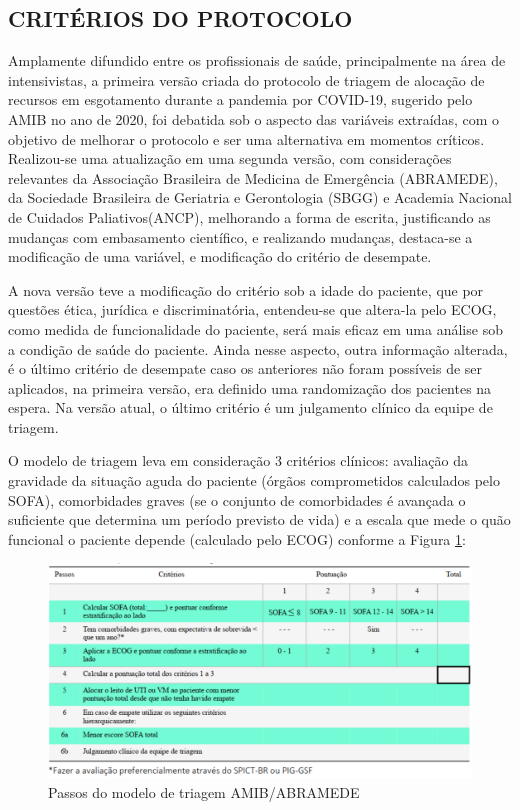 \documentclass[12pt]{article}
\begin{document}
\subsection{CRITÉRIOS DO PROTOCOLO}

Amplamente difundido entre os profissionais de saúde, principalmente na área de intensivistas, a primeira versão criada do protocolo de triagem de alocação de recursos em esgotamento durante a pandemia por COVID-19, sugerido pelo AMIB no ano de 2020, foi debatida sob o aspecto das variáveis extraídas, com o objetivo de melhorar o protocolo e ser uma alternativa em momentos críticos. Realizou-se uma atualização em uma segunda versão, com considerações relevantes da Associação Brasileira de Medicina de Emergência (ABRAMEDE), da Sociedade Brasileira de Geriatria e Gerontologia (SBGG) e Academia Nacional de Cuidados Paliativos(ANCP), melhorando a forma de escrita, justificando as mudanças com embasamento científico, e realizando mudanças, destaca-se a modificação de uma variável, e modificação do critério de desempate.

A nova versão teve a modificação do critério sob a idade do paciente, que por questões ética, jurídica e discriminatória, entendeu-se que altera-la pelo ECOG, como medida de funcionalidade do paciente, será mais eficaz em uma análise sob a condição de saúde do paciente.
Ainda nesse aspecto, outra informação alterada, é o último critério de desempate caso os anteriores não foram possíveis de ser aplicados, na primeira versão, era definido uma randomização dos pacientes na espera. Na versão atual, o último critério é um julgamento clínico da equipe de triagem.

O modelo de triagem leva em consideração 3 critérios clínicos: avaliação da gravidade da situação aguda do paciente (órgãos comprometidos calculados pelo SOFA), comorbidades graves (se o conjunto de comorbidades é avançada o suficiente que determina um período previsto de vida) e a escala que mede o quão funcional o paciente depende (calculado pelo ECOG) conforme a Figura \ref{Passos-modelo-triagem-AMIB-ABRAMEDE}:

\begin{figure}[H]
    \centering
    \includegraphics[scale=0.5]{img/Tabela de pontuacoes e criterios.png}
    \centering
    \caption{Passos do modelo de triagem AMIB/ABRAMEDE \cite{kretzer2020recomendaccoes}}
    \label{Passos-modelo-triagem-AMIB-ABRAMEDE}
\end{figure}
\end{document}
